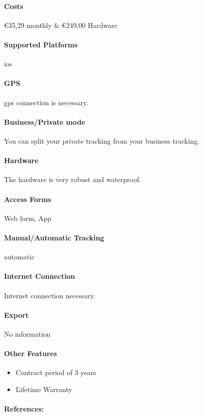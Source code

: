 \paragraph{Costs} \euro 35,29 monthly \& \euro 249,00 Hardware
\paragraph{Supported Platforms} \gls{ios}
\paragraph{GPS} \gls{gps} connection is necessary.
\paragraph{Business/Private mode} You can split your private tracking from your business tracking.
\paragraph{Hardware}The hardware is very robust and waterproof.
\paragraph{Access Forms}Web form, App
\paragraph{Manual/Automatic Tracking}automatic
\paragraph{Internet Connection}Internet connection necessary.
\paragraph{Export}No information
\paragraph{Other Features} 
\begin{itemize}
\item Contract period of 3 years
\item Lifetime Warranty
\end{itemize}
\paragraph{References:} \cite{Abax_Triplog}
\newpage

